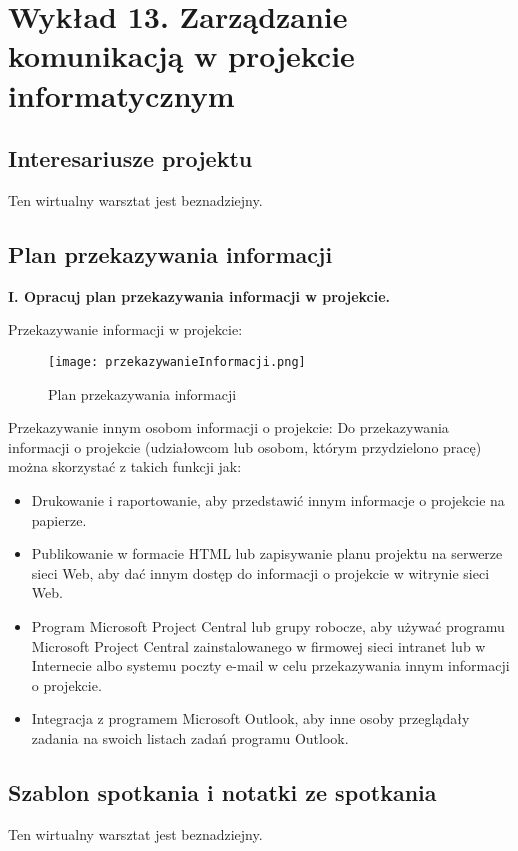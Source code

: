 ﻿\chapter{Wykład 13. Zarządzanie komunikacją w projekcie informatycznym}

\section{Interesariusze projektu}

Ten wirtualny warsztat jest beznadziejny.


\section{Plan przekazywania informacji}

\textbf{I. Opracuj plan przekazywania informacji w projekcie.}

Przekazywanie informacji w projekcie: 

\begin{figure}[!h]
\centering
\texttt{[image: przekazywanieInformacji.png]}
\caption{Plan przekazywania informacji}
\label{fig:przekazywanieInformacji}
\end{figure}

Przekazywanie innym osobom informacji o projekcie:
 Do przekazywania informacji o projekcie (udziałowcom lub osobom, którym przydzielono pracę) można skorzystać z takich funkcji jak:
\begin{itemize}
\item Drukowanie i raportowanie, aby przedstawić innym informacje o projekcie na papierze. 
\item Publikowanie w formacie HTML lub zapisywanie planu projektu na serwerze sieci Web, aby dać innym dostęp do informacji o projekcie w witrynie sieci Web. 
\item Program Microsoft Project Central lub grupy robocze, aby używać programu Microsoft Project Central zainstalowanego w firmowej sieci intranet lub w Internecie albo systemu poczty e-mail w celu przekazywania innym informacji o projekcie. 
\item Integracja z programem Microsoft Outlook, aby inne osoby przeglądały zadania na swoich listach zadań programu Outlook.
\end{itemize}



\section{Szablon spotkania i notatki ze spotkania}

Ten wirtualny warsztat jest beznadziejny.



